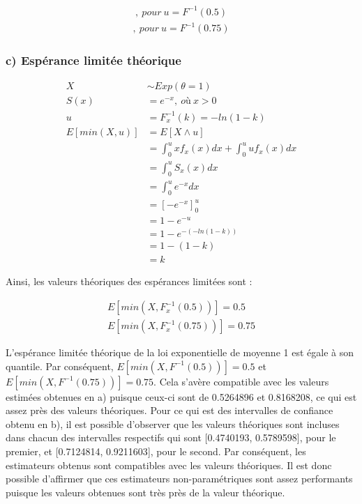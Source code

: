 \documentclass[]{article}
\begin{document}
\begin{align*}
[0.4740193, 0.5789598] ,\ pour \ u = F^{-1}(0.5)
\end{align*}\begin{align*}
[0.7124814, 0.9211603] ,\ pour \ u = F^{-1}(0.75)
\end{align*}

\newpage

\subsubsection{c) Espérance limitée
théorique}\label{c-esperance-limitee-theorique}

\begin{align*}
    X 
    &\sim Exp(\theta = 1) \\
    S(x) 
    &= e^{-x}, \ où \ x>0 \\
    u
    &=F_x^{-1}(k) = -ln(1-k)\\
    E\left[ min(X,u) \right]
    &=E\left[ X \wedge u \right] \\
    &=\int_{0}^{u} x f_x(x) dx + \int_{0}^{u} u f_x(x) dx \\
    &=\int_{0}^{u} S_x(x) dx \\
    &=\int_{0}^{u} e^{-x} dx  \\
    &=[-e^{-x}]_{0}^{u} \\
    &=1 - e^{-u} \\
    &=1 - e^{-(-ln(1-k))} \\
    &=1 - (1-k) \\
    &= k
\end{align*}

Ainsi, les valeurs théoriques des espérances limitées sont :

\begin{align*}
    E\left[min(X,F_x^{-1}(0.5))\right] = 0.5 \\
    E\left[min(X,F_x^{-1}(0.75))\right] = 0.75
\end{align*}

L'espérance limitée théorique de la loi exponentielle de moyenne 1 est
égale à son quantile. Par conséquent, \(E[min(X,F^{-1}(0.5))] = 0.5\) et
\(E[min(X,F^{-1}(0.75))] = 0.75\). Cela s'avère compatible avec les
valeurs estimées obtenues en a) puisque ceux-ci sont de 0.5264896 et
0.8168208, ce qui est assez près des valeurs théoriques. Pour ce qui est
des intervalles de confiance obtenu en b), il est possible d'observer
que les valeurs théoriques sont incluses dans chacun des intervalles
respectifs qui sont {[}0.4740193, 0.5789598{]}, pour le premier, et
{[}0.7124814, 0.9211603{]}, pour le second. Par conséquent, les
estimateurs obtenus sont compatibles avec les valeurs théoriques. Il est
donc possible d'affirmer que ces estimateurs non-paramétriques sont
assez performants puisque les valeurs obtenues sont très près de la
valeur théorique.
\end{document}

